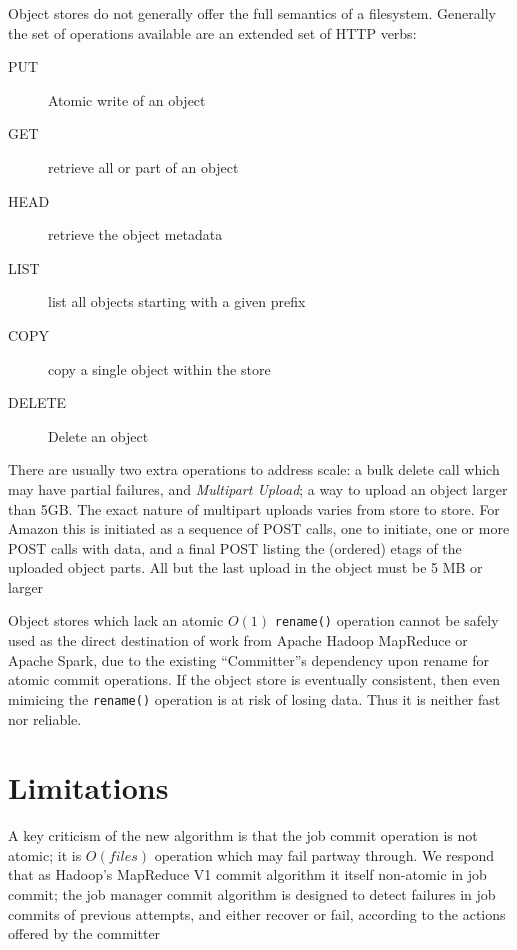 \documentclass[9pt,technote]{IEEEtran}
\begin{document}


Object stores do not generally offer the full semantics of a filesystem.
Generally the set of operations available are an extended set of HTTP verbs:

\begin{description}
  \item[PUT] Atomic write of an object
  \item[GET] retrieve all or part of an object
  \item[HEAD] retrieve the object metadata
  \item[LIST] list all objects starting with a given prefix
  \item[COPY] copy a single object within the store
  \item[DELETE] Delete an object
\end{description}

There are usually two extra operations to address scale:
 a bulk delete call which may have partial failures,
and \emph{Multipart Upload}; a way to upload an object larger than 5GB\@.
The exact nature of multipart uploads varies from store to store.
For Amazon this is initiated as a sequence of POST calls, one to initiate,
one or more POST calls with data, and a final POST listing the (ordered)
etags of the uploaded object parts.
All but the last upload in the object must be 5 MB or larger


Object stores which lack an atomic $O(1)$ \texttt{rename()} operation cannot
be safely used as the direct destination of work from Apache Hadoop MapReduce
or Apache Spark, due to the existing ``Committer''s dependency upon rename for
atomic commit operations.
If the object store is eventually consistent, then even mimicing the \texttt{rename()}
operation is at risk of losing data.
Thus it is neither fast nor reliable.


\section{Limitations}
\label{sec:limitations}

A key criticism of the new algorithm is that the job commit operation is not atomic;
it is $O(files)$ operation which may fail partway through.
We respond that as Hadoop's MapReduce V1 commit algorithm it itself non-atomic in job commit;
the job manager commit algorithm is designed to detect failures in job commits
of previous attempts, and either recover or fail, according to the actions
offered by the committer
\end{document}
